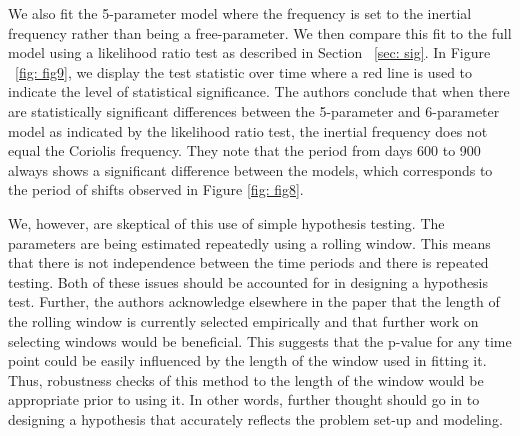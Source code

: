 \documentclass{stat572Style}
\begin{document}
   
   

\par We also fit the 5-parameter model where the frequency is set to the inertial frequency rather than being a free-parameter. 
We then compare this fit to the full model using a likelihood ratio test as described in Section ~\ref{sec: sig}.
 In Figure ~\ref{fig: fig9}, we display the test statistic over time where a red line is used to indicate the level of statistical significance. 
The authors conclude that when there are statistically significant differences between the 5-parameter and 6-parameter model as indicated by the likelihood ratio test,   the inertial frequency does not equal the Coriolis frequency.   
They note that the period from days 600 to 900 always shows a significant difference between the models, which corresponds to the period of shifts observed in Figure \ref{fig: fig8}.

\par We, however, are skeptical of this use of simple hypothesis testing. 
The parameters are being estimated repeatedly using a rolling window. 
This means that there is not independence between the time periods and there is repeated testing. 
Both of these issues should be accounted for in designing a hypothesis test. 
Further, the authors acknowledge elsewhere in the paper that the length of the rolling window is currently selected empirically and that further work on selecting windows would be beneficial. 
This suggests that the p-value for any time point could be easily influenced by the length of the window used in fitting it.
Thus, robustness checks of this method to the length of the window would be appropriate prior to using it.
In other words, further thought should go in to designing a hypothesis that accurately reflects the problem set-up and modeling. 
\end{document}
